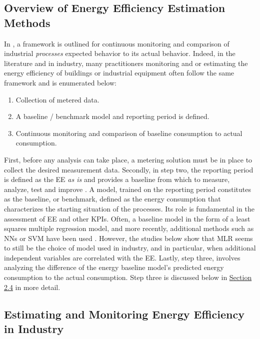 \subsection{Overview of Energy Efficiency Estimation Methods}

In \cite{kini_methodology_2011}, a framework is outlined for continuous monitoring and comparison of industrial \textit{processes} expected behavior to its actual behavior. Indeed, in the literature and in industry, many practitioners monitoring and or estimating the energy efficiency of buildings or industrial equipment often follow the same framework and is enumerated below: 

\begin{enumerate}
    \item Collection of metered data.
    \item A baseline / benchmark model and reporting period is defined.
    \item Continuous monitoring and comparison of baseline consumption to actual consumption.
\end{enumerate}

First, before any analysis can take place, a metering solution must be in place to collect the desired measurement data. Secondly, in step two, the reporting period is defined as the EE \textit{as is} and provides a baseline from which to measure, analyze, test and improve \cite{oakland_statistical_2008}. A model, trained on the reporting period constitutes as the baseline, or benchmark, defined as the energy consumption that characterizes the starting situation of the processes. Its role is fundamental in the assessment of EE and other \ac{KPIs}. Often, a baseline model in the form of a least squares multiple regression model, and more recently, additional methods such as \ac{NNs} or \ac{SVM} have been used \cite{cas}. However, the studies below show that  \ac{MLR} seems to still be the choice of model used in industry, and in particular, when additional independent variables are correlated with the EE. Lastly, step three, involves analyzing the difference of the energy baseline model's predicted energy consumption to the actual consumption. Step three is discussed below in \hyperlink{subsection.2.4}{Section 2.4} in more detail.

\subsection{Estimating and Monitoring Energy Efficiency in Industry}

